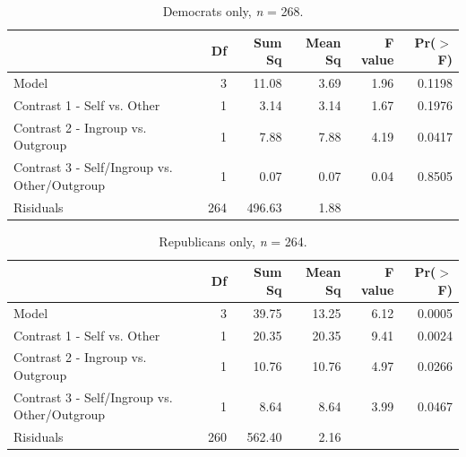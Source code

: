 \documentclass[12pt,]{article}
\begin{document}
\vspace{0.6cm}

\begin{table}[ht]
\centering
\begin{tabular}{lrrrrr}
  \hline
 & Df & Sum Sq & Mean Sq & F value & Pr($>$F) \\ 
  \hline
Model & 3 & 11.08 & 3.69 & 1.96 & 0.1198 \\ 
  Contrast 1 - Self vs. Other & 1 & 3.14 & 3.14 & 1.67 & 0.1976 \\ 
  Contrast 2 - Ingroup vs. Outgroup & 1 & 7.88 & 7.88 & 4.19 & 0.0417 \\ 
  Contrast 3 - Self/Ingroup vs. Other/Outgroup & 1 & 0.07 & 0.07 & 0.04 & 0.8505 \\ 
  Risiduals & 264 & 496.63 & 1.88 &  &  \\ 
   \hline
\end{tabular}
\caption{Democrats only, \emph{n} = 268.} 
\label{dems2}
\end{table}

\vspace{0.6cm}

\begin{table}[ht]
\centering
\begin{tabular}{lrrrrr}
  \hline
 & Df & Sum Sq & Mean Sq & F value & Pr($>$F) \\ 
  \hline
Model & 3 & 39.75 & 13.25 & 6.12 & 0.0005 \\ 
  Contrast 1 - Self vs. Other & 1 & 20.35 & 20.35 & 9.41 & 0.0024 \\ 
  Contrast 2 - Ingroup vs. Outgroup & 1 & 10.76 & 10.76 & 4.97 & 0.0266 \\ 
  Contrast 3 - Self/Ingroup vs. Other/Outgroup & 1 & 8.64 & 8.64 & 3.99 & 0.0467 \\ 
  Risiduals & 260 & 562.40 & 2.16 &  &  \\ 
   \hline
\end{tabular}
\caption{Republicans only, \emph{n} = 264. } 
\label{reps2}
\end{table}
\end{document}
